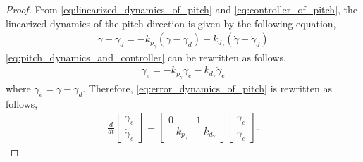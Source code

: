 \begin{proof}
    From \eqref{eq:linearized_dynamics_of_pitch} and \eqref{eq:controller_of_pitch}, the linearized dynamics of the pitch direction is given by the following equation,
    \begin{align}
        \label{eq:pitch_dynamics_and_controller}
        \ddot{\gamma} - \ddot{\gamma}_d= - k_{p_{\gamma}} (\gamma - \gamma_d) - k_{d_{\gamma}} (\dot{\gamma} - \dot{\gamma}_d)
    \end{align}
    \eqref{eq:pitch_dynamics_and_controller} can be rewritten as follows,
    \begin{align}
        \label{eq:error_dynamics_of_pitch}
        \ddot{\gamma}_e = - k_{p_{\gamma}} \gamma_e - k_{d_{\gamma}} \dot{\gamma}_e
    \end{align}
    where $ \gamma_e = \gamma - \gamma_d $.
    Therefore, \eqref{eq:error_dynamics_of_pitch} is rewritten as follows,
    \begin{align}
        \label{eq:error_dynamics_of_pitch_matrix}
        \frac{d}{dt}
        \begin{bmatrix}
            \gamma_e \\
            \dot{\gamma}_e
        \end{bmatrix}
        =
        \begin{bmatrix}
            0 & 1 \\
            - k_{p_{\gamma}} & -k_{d_{\gamma}}
        \end{bmatrix}
        \begin{bmatrix}
            \gamma_e \\
            \dot{\gamma}_e
        \end{bmatrix}.
    \end{align}


\end{proof}
